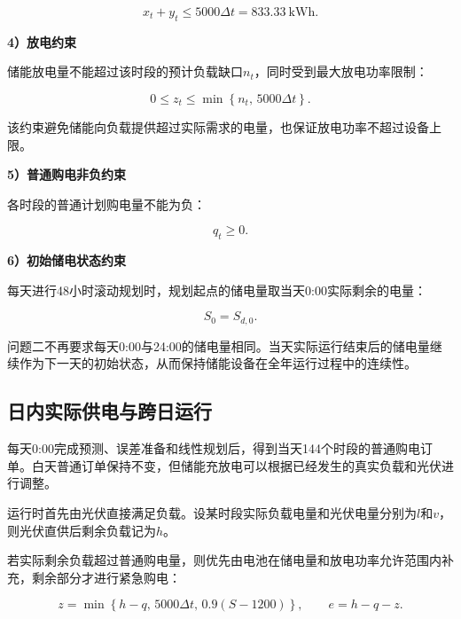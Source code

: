 \begin{equation}
x_t+y_t
\leq
5000\Delta t
=
833.33\ \mathrm{kWh}.
\label{eq:q2_charge_limit}
\end{equation}


\textbf{4）放电约束}

储能放电量不能超过该时段的预计负载缺口$n_t$，同时受到最大放电功率限制：

\begin{equation}
0
\leq
z_t
\leq
\min
\left\{
n_t,\,
5000\Delta t
\right\}.
\label{eq:q2_discharge_limit}
\end{equation}

该约束避免储能向负载提供超过实际需求的电量，也保证放电功率不超过设备上限。


\textbf{5）普通购电非负约束}

各时段的普通计划购电量不能为负：

\begin{equation}
q_t\geq0.
\label{eq:q2_purchase_nonnegative}
\end{equation}


\textbf{6）初始储电状态约束}

每天进行48小时滚动规划时，规划起点的储电量取当天0:00实际剩余的电量：

\begin{equation}
S_0=S_{d,0}.
\label{eq:q2_initial_soc}
\end{equation}

问题二不再要求每天0:00与24:00的储电量相同。当天实际运行结束后的储电量继续作为下一天的初始状态，从而保持储能设备在全年运行过程中的连续性。


\subsection{日内实际供电与跨日运行}

每天0:00完成预测、误差准备和线性规划后，得到当天144个时段的普通购电订单。白天普通订单保持不变，但储能充放电可以根据已经发生的真实负载和光伏进行调整。

运行时首先由光伏直接满足负载。设某时段实际负载电量和光伏电量分别为$l$和$v$，则光伏直供后剩余负载记为$h$。

若实际剩余负载超过普通购电量，则优先由电池在储电量和放电功率允许范围内补充，剩余部分才进行紧急购电：

\begin{equation}
z
=
\min
\left\{
h-q,\,
5000\Delta t,\,
0.9(S-1200)
\right\},
\qquad
e=h-q-z.
\label{eq:q2_emergency}
\end{equation}

